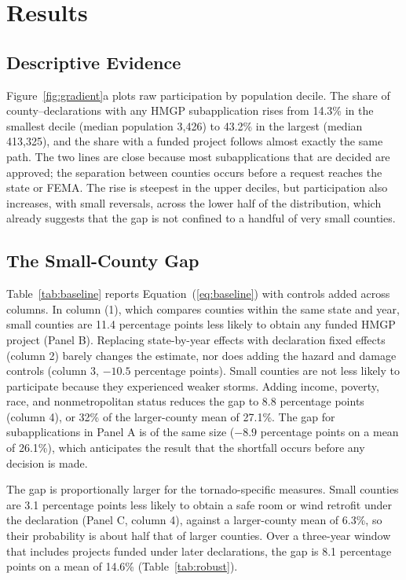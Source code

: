 \documentclass[12pt]{article}
\begin{document}
\section{Results}

\subsection{Descriptive Evidence}

Figure~\ref{fig:gradient}a plots raw participation by population decile. The share of county--declarations with any HMGP subapplication rises from 14.3\% in the smallest decile (median population 3,426) to 43.2\% in the largest (median 413,325), and the share with a funded project follows almost exactly the same path. The two lines are close because most subapplications that are decided are approved; the separation between counties occurs before a request reaches the state or FEMA. The rise is steepest in the upper deciles, but participation also increases, with small reversals, across the lower half of the distribution, which already suggests that the gap is not confined to a handful of very small counties.

\subsection{The Small-County Gap}

Table~\ref{tab:baseline} reports Equation~(\ref{eq:baseline}) with controls added across columns. In column (1), which compares counties within the same state and year, small counties are 11.4 percentage points less likely to obtain any funded HMGP project (Panel B). Replacing state-by-year effects with declaration fixed effects (column 2) barely changes the estimate, nor does adding the hazard and damage controls (column 3, $-10.5$ percentage points). Small counties are not less likely to participate because they experienced weaker storms. Adding income, poverty, race, and nonmetropolitan status reduces the gap to 8.8 percentage points (column 4), or 32\% of the larger-county mean of 27.1\%. The gap for subapplications in Panel A is of the same size ($-8.9$ percentage points on a mean of 26.1\%), which anticipates the result that the shortfall occurs before any decision is made.

The gap is proportionally larger for the tornado-specific measures. Small counties are 3.1 percentage points less likely to obtain a safe room or wind retrofit under the declaration (Panel C, column 4), against a larger-county mean of 6.3\%, so their probability is about half that of larger counties. Over a three-year window that includes projects funded under later declarations, the gap is 8.1 percentage points on a mean of 14.6\% (Table~\ref{tab:robust}).
\end{document}
